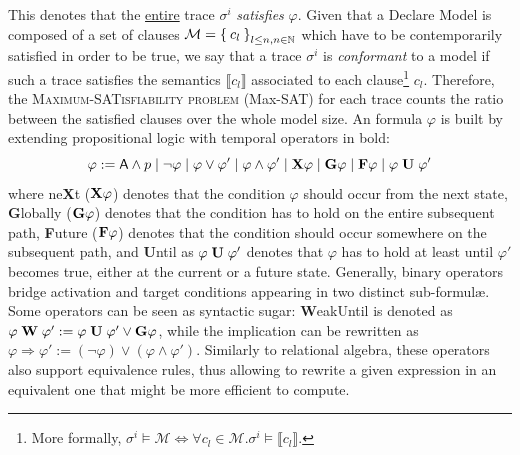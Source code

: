  This
 denotes that the \underline{entire} trace $\sigma^i$ \textit{satisfies} $\varphi$. Given that a Declare Model  is composed of a set of clauses $\mathcal{M}=\Set{c_l}_{l\leq n,n\in\mathbb{N}}$ which have to be contemporarily satisfied in order to be true, we say that a trace $\sigma^i$ is \textit{conformant} to a model if such a trace satisfies the  \LTLf semantics $\llbracket c_l\rrbracket$ associated to each clause\footnote{More formally, $\sigma^i\vDash\mathcal{M}\Leftrightarrow \forall c_l\in \mathcal{M}. \sigma^i\vDash\llbracket c_l\rrbracket$.} $c_l$. Therefore, the \textsc{Maximum-SATisfiability problem} (Max-SAT) for each trace counts the ratio between the satisfied clauses over the whole model size.
 An \LTLf formula $\varphi$ is built by extending propositional logic with temporal operators in bold: \[\varphi:=\textsf{A}\wedge p\;|\;\neg \varphi\;|\;\varphi\vee \varphi'\;|\;\varphi\wedge\varphi'\;|\;\mathbf{X}{\varphi}\;|\;\mathbf{G}{\varphi}\;|\;\mathbf{F}{\varphi}\;|\;{\varphi}\;\mathbf{U}\;{\varphi'}\] where ne\textbf{X}t ($\mathbf{X}{\varphi}$) denotes that the condition $\varphi$ should occur from the next state, \textbf{G}lobally ($\mathbf{G}{\varphi}$) denotes that the condition has to hold on the entire subsequent path, \textbf{F}uture ($\mathbf{F}{\varphi}$) denotes that the condition should occur somewhere on the subsequent path, and \textbf{U}ntil as ${\varphi}\;\mathbf{U}\;{\varphi'}$ denotes that $\varphi$ has to hold at least until $\varphi'$ becomes true, either at the current or a future state. Generally, binary operators bridge activation and target conditions appearing in two distinct sub-formul\ae. Some operators can be seen as syntactic sugar: \textbf{W}eakUntil is denoted as  ${\varphi}\;\mathbf{W}\;{\varphi'}:={\varphi}\;\mathbf{U}\;{\varphi'}\vee\mathbf{G}{\varphi}$, while the implication can be rewritten as $\varphi\Rightarrow\varphi':=(\neg \varphi)\vee (\varphi\wedge \varphi')$. Similarly to relational algebra, these operators also support equivalence rules, thus allowing to rewrite a given \LTLf expression in an equivalent one that might be more efficient to compute.

